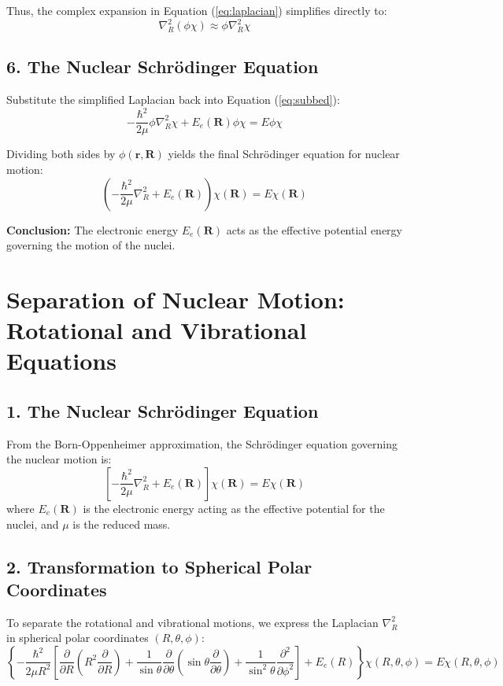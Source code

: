\documentclass{book}
\begin{document}
Thus, the complex expansion in Equation (\ref{eq:laplacian}) simplifies directly to:
\begin{equation}
    \nabla_R^2 (\phi \chi) \approx \phi \nabla_R^2 \chi
\end{equation}

\subsection*{6. The Nuclear Schrödinger Equation}
Substitute the simplified Laplacian back into Equation (\ref{eq:subbed}):
\begin{equation}
    -\frac{\hbar^2}{2\mu} \phi \nabla_R^2 \chi + E_e(\mathbf{R}) \phi \chi = E \phi \chi
\end{equation}
% 

Dividing both sides by $\phi(\mathbf{r}, \mathbf{R})$ yields the final Schrödinger equation for nuclear motion:
\begin{equation}
    \left( -\frac{\hbar^2}{2\mu} \nabla_R^2 + E_e(\mathbf{R}) \right) \chi(\mathbf{R}) = E \chi(\mathbf{R})
\end{equation}

\textbf{Conclusion:} The electronic energy $E_e(\mathbf{R})$ acts as the effective potential energy governing the motion of the nuclei.

\section*{Separation of Nuclear Motion: Rotational and Vibrational Equations}

\subsection*{1. The Nuclear Schrödinger Equation}
From the Born-Oppenheimer approximation, the Schrödinger equation governing the nuclear motion is:
\begin{equation}
    \left[ -\frac{\hbar^2}{2\mu} \nabla_R^2 + E_e(\mathbf{R}) \right] \chi(\mathbf{R}) = E \chi(\mathbf{R})
\end{equation}
where $E_e(\mathbf{R})$ is the electronic energy acting as the effective potential for the nuclei, and $\mu$ is the reduced mass.

\subsection*{2. Transformation to Spherical Polar Coordinates}
To separate the rotational and vibrational motions, we express the Laplacian $\nabla_R^2$ in spherical polar coordinates $(R, \theta, \phi)$:
\begin{equation}
    \left\{ -\frac{\hbar^2}{2\mu R^2} \left[ \frac{\partial}{\partial R} \left( R^2 \frac{\partial}{\partial R} \right) + \frac{1}{\sin\theta} \frac{\partial}{\partial \theta} \left( \sin\theta \frac{\partial}{\partial \theta} \right) + \frac{1}{\sin^2\theta} \frac{\partial^2}{\partial \phi^2} \right] + E_e(R) \right\} \chi(R, \theta, \phi) = E \chi(R, \theta, \phi)
\end{equation}
\end{document}
